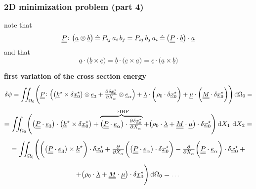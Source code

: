 \begin{frame}
  \frametitle{2D minimization problem (part 4)}

  note that
  \begin{displaymath}
    \underline{\underline{P}} \colon \bigl( \underline{a} \otimes \underline{b} \bigr) \: \hat{=} \: P_{ij} \, a_i \, b_j = P_{ij} \, b_j \, a_i \: \hat{=} \: \bigl( \underline{\underline{P}} \cdot \underline{b} \bigr) \cdot \underline{a}
  \end{displaymath}
  and that
  \begin{displaymath}
    \underline{a} \cdot \bigl( \underline{b} \times \underline{c} \bigr) =
    \underline{b} \cdot \bigl( \underline{c} \times \underline{a} \bigr) =
    \underline{c} \cdot \bigl( \underline{a} \times \underline{b} \bigr)
  \end{displaymath}

  \vspace{1em}
  \textbf{first variation of the cross section energy}
  \begin{displaymath}
    \delta \psi = 
    \iint_{\Omega_0} \Biggl(
      \doubleunderline{P} \colon \Bigl(
        \bigl( \underline{k}^{\star} \times \delta \underline{x}_0^{\star} \bigr) \otimes \underline{e}_3 +
        \pd{\delta \underline{x}_0^{\star}}{X_{\alpha}} \otimes \underline{e}_{\alpha}
      \Bigr) +
      \underline{\lambda} \cdot \biggl( \rho_0 \cdot \delta \underline{x}_0^{\star} \biggr) +
      \underline{\mu} \cdot \biggl( \doubleunderline{M} \cdot \delta \underline{x}_0^{\star} \biggr)
    \Biggr) \dif \Omega_0 = 
  \end{displaymath}
  \begin{displaymath}
    = \iint_{\Omega_0} \Biggl(
      \bigl( \doubleunderline{P} \cdot \underline{e}_3 \bigr) \cdot \bigl( \underline{k}^{\star} \times \delta \underline{x}_0^{\star} \bigr) +
      \overbrace{
      \bigl( \doubleunderline{P} \cdot \underline{e}_{\alpha} \bigr) \cdot \pd{\delta \underline{x}_0^{\star}}{X_{\alpha}} }^{\rightarrow \text{IBP}} +
      \bigl(
        \rho_0 \cdot \underline{\lambda} +
        \doubleunderline{M} \cdot \underline{\mu}
      \bigr) \cdot \delta \underline{x}_0^{\star}
    \Biggr) \dif X_1 \, \dif X_2 =
  \end{displaymath}
  \begin{displaymath}
    = \iint_{\Omega_0} \Biggl(
      \biggl( \bigl( \doubleunderline{P} \cdot \underline{e}_3 \bigr) \times \underline{k}^{\star} \biggr) \cdot \delta \underline{x}_0^{\star} +
      \pd{}{X_{\alpha}} \biggl( \bigl( \doubleunderline{P} \cdot \underline{e}_{\alpha} \bigr) \cdot \delta \underline{x}_0^{\star} \biggr) -
      \pd{}{X_{\alpha}} \biggl( \doubleunderline{P} \cdot \underline{e}_{\alpha} \biggr) \cdot \delta \underline{x}_0^{\star} \: +
  \end{displaymath}
  \begin{displaymath}
      + \bigl(
        \rho_0 \cdot \underline{\lambda} +
        \doubleunderline{M} \cdot \underline{\mu}
      \bigr) \cdot \delta \underline{x}_0^{\star}
    \Biggr) \dif \Omega_0 = \dots
  \end{displaymath}
  

\end{frame}
